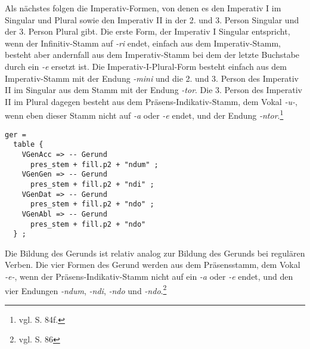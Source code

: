 Als nächstes folgen die Imperativ-Formen, von denen es den Imperativ I im Singular und Plural sowie den Imperativ II in der 2. und 3. Person Singular und der 3. Person Plural gibt. Die erste Form, der Imperativ I Singular entspricht, wenn der Infinitiv-Stamm auf \textit{-ri} endet, einfach aus dem Imperativ-Stamm, besteht aber andernfall  aus dem Imperativ-Stamm bei dem der letzte Buchstabe durch ein \textit{-e} ersetzt ist. Die Imperativ-I-Plural-Form besteht einfach aus dem Imperativ-Stamm mit der Endung \textit{-mini} und die 2. und 3. Person des Imperativ II im Singular aus dem Stamm mit der Endung \textit{-tor}. Die 3. Person des Imperativ II im Plural dagegen besteht aus dem Präsens-Indikativ-Stamm, dem Vokal \textit{-u-}, wenn eben dieser Stamm nicht auf \textit{-a} oder \textit{-e} endet, und der Endung \textit{-ntor}.\footnote{vgl. \cite{BAYER-LINDAUER1994} S. 84f.} \par
\begin{lstlisting}[float=h!tp,caption={Ausschnitt aus der Funktion \texttt{mkDeponent} um Gerund-Verbformen zu bilden (vgl. \textbf{ResLat.gf})},label={GF-Res-MkDeponent-Ger},basicstyle=\small]
ger = 
  table {
    VGenAcc => -- Gerund
      pres_stem + fill.p2 + "ndum" ;
    VGenGen => -- Gerund
      pres_stem + fill.p2 + "ndi" ;
    VGenDat => -- Gerund
      pres_stem + fill.p2 + "ndo" ;
    VGenAbl => -- Gerund
      pres_stem + fill.p2 + "ndo" 
  } ;
\end{lstlisting}
Die Bildung des Gerunds ist relativ analog zur Bildung des Gerunds bei regulären Verben. Die vier Formen des Gerund werden aus dem Präsensstamm, dem Vokal \textit{-e-}, wenn der Präsens-Indikativ-Stamm nicht auf ein \textit{-a} oder \textit{-e} endet, und den vier Endungen \textit{-ndum}, \textit{-ndi}, \textit{-ndo} und \textit{-ndo}.\footnote{vgl. \cite{BAYER-LINDAUER1994} S. 86} \par
